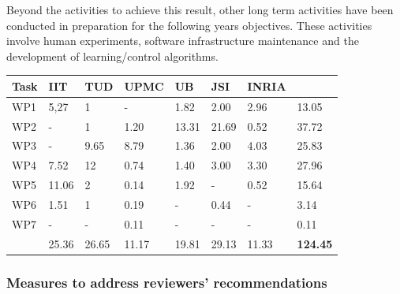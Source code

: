 \documentclass[12pt,a4paper,twoside]{article}
\begin{document}
Beyond the activities to achieve this result, other long term activities have been conducted in preparation for the following years objectives. These activities involve human experiments, software infrastructure maintenance and the development of learning/control algorithms.

\begin{longtable}{|C{1.5cm}|C{1.5cm}|C{1.5cm}|C{1.5cm}|C{1.5cm}|C{1.5cm}|C{1.5cm}|C{1.5cm}|}
\footnotesize \textbf{Task}& \footnotesize \textbf{IIT}&\footnotesize \textbf{TUD}&\footnotesize \textbf{UPMC}& \footnotesize \textbf{UB} &\footnotesize \textbf{JSI} &\footnotesize \textbf{INRIA} &  \\ \hline
\footnotesize WP1      &  5,27     &  1      &  -      &  1.82   &  2.00  &  2.96  &  13.05\\  \hline
\footnotesize WP2      &  -        &  1      &  1.20   &  13.31  &  21.69 &  0.52  &  37.72\\  \hline
\footnotesize WP3      &  -        &  9.65   &  8.79   &  1.36   &  2.00  &  4.03  &  25.83\\  \hline
\footnotesize WP4      &  7.52     &  12     &  0.74   &  1.40   &  3.00  &  3.30  &  27.96\\  \hline
\footnotesize WP5      &  11.06    &  2      &  0.14   &  1.92   &  -     &  0.52  &  15.64\\  \hline
\footnotesize WP6      &  1.51     &  1      &  0.19   &  -      &  0.44  &  -     &   3.14\\  \hline
\footnotesize WP7      &  -        &  -      &  0.11   &  -      &  -     &  -     &   0.11\\  \hline
{}  &  25.36    &  26.65  &  11.17  &  19.81  &  29.13 &  11.33 &  \textbf{124.45}     \\  
\end{longtable}

\subsubsection*{Measures to address reviewers' recommendations}

\end{document}
